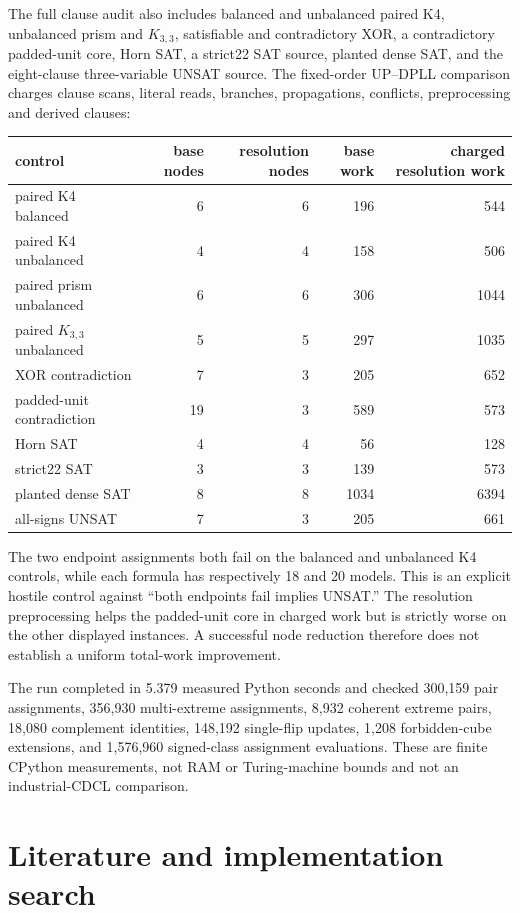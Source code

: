 \documentclass[11pt]{article}
\begin{document}
The full clause audit also includes balanced and unbalanced paired K4,
unbalanced prism and $K_{3,3}$, satisfiable and contradictory XOR, a
contradictory padded-unit core, Horn SAT, a strict22 SAT source, planted dense
SAT, and the eight-clause three-variable UNSAT source.  The fixed-order
UP--DPLL comparison charges clause scans, literal reads, branches,
propagations, conflicts, preprocessing and derived clauses:

\begin{center}\small
\begin{tabular}{lrrrr}
\toprule
control & base nodes & resolution nodes & base work & charged resolution work\\
\midrule
paired K4 balanced & 6&6&196&544\\
paired K4 unbalanced &4&4&158&506\\
paired prism unbalanced &6&6&306&1044\\
paired $K_{3,3}$ unbalanced &5&5&297&1035\\
XOR contradiction &7&3&205&652\\
padded-unit contradiction &19&3&589&573\\
Horn SAT &4&4&56&128\\
strict22 SAT &3&3&139&573\\
planted dense SAT &8&8&1034&6394\\
all-signs UNSAT &7&3&205&661\\
\bottomrule
\end{tabular}
\end{center}

The two endpoint assignments both fail on the balanced and unbalanced K4
controls, while each formula has respectively 18 and 20 models.  This is an
explicit hostile control against ``both endpoints fail implies UNSAT.''  The
resolution preprocessing helps the padded-unit core in charged work but is
strictly worse on the other displayed instances.  A successful node reduction
therefore does not establish a uniform total-work improvement.

The run completed in 5.379 measured Python seconds and checked 300,159 pair
assignments, 356,930 multi-extreme assignments, 8,932 coherent extreme pairs,
18,080 complement identities, 148,192 single-flip updates, 1,208 forbidden-cube
extensions, and 1,576,960 signed-class assignment evaluations.  These are
finite CPython measurements, not RAM or Turing-machine bounds and not an
industrial-CDCL comparison.

\section{Literature and implementation search}
\end{document}
